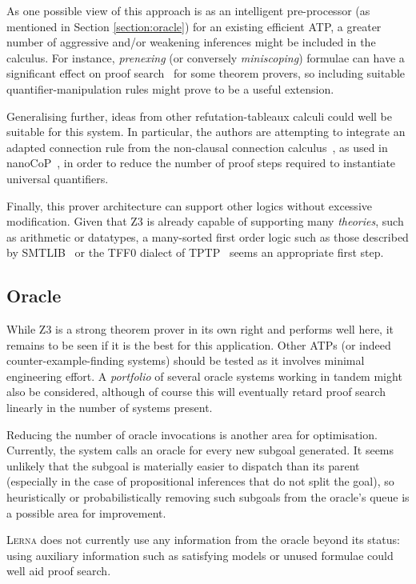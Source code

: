 \documentclass[runningheads]{llncs}
\newcommand{\lerna}{\textsc{Lerna}}
\newcommand{\z}[1]{\textsc{Z3}}
\begin{document}
As one possible view of this approach is as an intelligent pre-processor (as mentioned in Section \ref{section:oracle}) for an existing efficient ATP, a greater number of aggressive and/or weakening inferences might be included in the calculus.
For instance, \emph{prenexing} (or conversely \emph{miniscoping}) formulae can have a significant effect on proof search~\cite{clausification} for some theorem provers, so including suitable quantifier-manipulation rules might prove to be a useful extension.

Generalising further, ideas from other refutation-tableaux calculi could well be suitable for this system.
In particular, the authors are attempting to integrate an adapted connection rule from the non-clausal connection calculus~\cite{non-clausal-connections}, as used in nanoCoP~\cite{nanocop}, in order to reduce the number of proof steps required to instantiate universal quantifiers.

Finally, this prover architecture can support other logics without excessive modification.
Given that \z3 is already capable of supporting many \emph{theories}, such as arithmetic or datatypes, a many-sorted first order logic such as those described by SMTLIB~\cite{smtlib} or the TFF0 dialect of TPTP~\cite{tff0} seems an appropriate first step.

\subsection{Oracle}
While \z3 is a strong theorem prover in its own right and performs well here, it remains to be seen if it is the best for this application.
Other ATPs (or indeed counter-example-finding systems) should be tested as it involves minimal engineering effort.
A \emph{portfolio} of several oracle systems working in tandem might also be considered, although of course this will eventually retard proof search linearly in the number of systems present.

Reducing the number of oracle invocations is another area for optimisation.
Currently, the system calls an oracle for every new subgoal generated.
It seems unlikely that the subgoal is materially easier to dispatch than its parent (especially in the case of propositional inferences that do not split the goal), so heuristically or probabilistically removing such subgoals from the oracle's queue is a possible area for improvement.

\lerna{} does not currently use any information from the oracle beyond its status: using auxiliary information such as satisfying models or unused formulae could well aid proof search.
\end{document}
